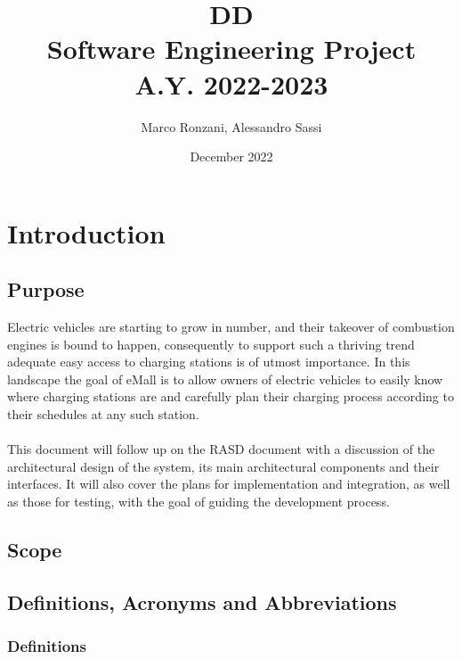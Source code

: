 \documentclass[11pt]{article}
\title{%
  \textbf{DD} \\
  \large Software Engineering Project \\ A.Y. 2022-2023}
\author{Marco Ronzani, Alessandro Sassi}
\date{December 2022}
\begin{document}
\maketitle

\doublespacing
\tableofcontents
\singlespacing

\section{Introduction}
\label{section:introduction}

\subsection{Purpose}

Electric vehicles are starting to grow in number, and their takeover of combustion engines is bound to happen, consequently to support such a thriving trend adequate easy access to charging stations is of utmost importance. In this landscape the goal of eMall is to allow owners of electric vehicles to easily know where charging stations are and carefully plan their charging process according to their schedules at any such station. \\
\\
This document will follow up on the RASD document with a discussion of the architectural design of the system, its main architectural components and their interfaces. It will also cover the plans for implementation and integration, as well as those for testing, with the goal of guiding the development process. \\

\subsection{Scope}

\subsection{Definitions, Acronyms and Abbreviations}

\subsubsection{Definitions}
\end{document}
